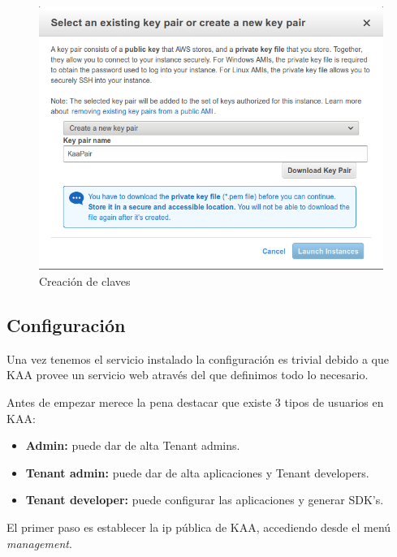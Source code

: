 \begin{figure}[!ht]
  \begin{center}
    \includegraphics[scale=0.45]{../images/kaa/7.png}
		\caption{Creación de claves}
    \label{fig:kaa}
	\end{center}
\end{figure}

\subsection{Configuración}

Una vez tenemos el servicio instalado la configuración es trivial debido a que KAA provee un servicio web através del que definimos todo lo necesario.

Antes de empezar merece la pena destacar que existe 3 tipos de usuarios en KAA:

\begin{itemize}
	\item \textbf{Admin: } puede dar de alta Tenant admins.
	\item \textbf{Tenant admin: } puede dar de alta aplicaciones y Tenant developers.
	\item \textbf{Tenant developer:} puede configurar las aplicaciones y generar SDK's.
\end{itemize}

\bigskip

El primer paso es establecer la ip pública de KAA, accediendo desde el menú \textit{management}.

